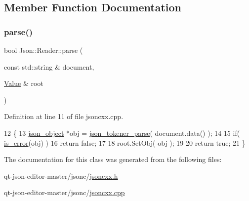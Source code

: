\subsection{Member Function Documentation}
\mbox{\label{class_json_1_1_reader_ada62b16488d21737bcf87a31ce5281d6}} 
\subsubsection{\texorpdfstring{parse()}{parse()}}
{\footnotesize\ttfamily bool Json\+::\+Reader\+::parse (\begin{DoxyParamCaption}\item[{const std\+::string \&}]{document,  }\item[{\hyperlink{class_json_1_1_value}{Value} \&}]{root }\end{DoxyParamCaption})}



Definition at line 11 of file jsoncxx.\+cpp.


\begin{DoxyCode}
12     \{
13         \hyperlink{structjson__object}{json\_object} *obj = \hyperlink{json__tokener_8c_abf031fdf1e5caab71e2225a99588c6bb}{json\_tokener\_parse}( document.data() );
14 
15         \textcolor{keywordflow}{if}( \hyperlink{bits_8h_a4a887e5fb7cde221bcab9c6f39d93fc1}{is\_error}(obj) )
16             \textcolor{keywordflow}{return} \textcolor{keyword}{false};
17 
18         root.SetObj( obj );
19 
20         \textcolor{keywordflow}{return} \textcolor{keyword}{true};
21     \}
\end{DoxyCode}


The documentation for this class was generated from the following files\+:\begin{DoxyCompactItemize}
\item 
qt-\/json-\/editor-\/master/jsonc/\hyperlink{jsoncxx_8h}{jsoncxx.\+h}\item 
qt-\/json-\/editor-\/master/jsonc/\hyperlink{jsoncxx_8cpp}{jsoncxx.\+cpp}\end{DoxyCompactItemize}
